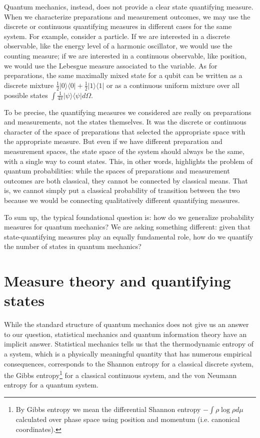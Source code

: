 \documentclass[entropy,article,submit,pdftex,moreauthors]{Definitions/mdpi}
\def\>{\rangle}
\def\<{\langle}
\begin{document}

Quantum mechanics, instead, does not provide a clear state quantifying measure. When we characterize preparations and measurement outcomes, we may use the discrete or continuous quantifying measures in different cases for the same system. For example, consider a particle. If we are interested in a discrete observable, like the energy level of a harmonic oscillator, we would use the counting measure; if we are interested in a continuous observable, like position, we would use the Lebesgue measure associated to the variable. As for preparations, the same maximally mixed state for a qubit can be written as a discrete mixture $\frac{1}{2} | 0 \> \< 0 | + \frac{1}{2} | 1 \> \< 1 | $ or as a continuous uniform mixture over all possible states $\int \frac{1}{4\pi} | \psi \> \< \psi | d\Omega$.

To be precise, the quantifying measures we considered are really on preparations and measurements, not the states themselves. It was the discrete or continuous character of the space of preparations that selected the appropriate space with the appropriate measure. But even if we have different preparation and measurement spaces, the state space of the system should always be the same, with a single way to count states. This, in other words, highlights the problem of quantum probabilities: while the spaces of preparations and measurement outcomes are both classical, they cannot be connected by classical means. That is, we cannot simply put a classical probability of transition between the two because we would be connecting qualitatively different quantifying measures.

To sum up, the typical foundational question is: how do we generalize probability measures for quantum mechanics? We are asking something different: given that state-quantifying measures play an equally fundamental role, how do we quantify the number of states in quantum mechanics?

\section{Measure theory and quantifying states}

While the standard structure of quantum mechanics does not give us an answer to our question, statistical mechanics and quantum information theory have an implicit answer. Statistical mechanics tells us that the thermodynamic entropy of a system, which is a physically meaningful quantity that has numerous empirical consequences, corresponds to the Shannon entropy for a classical discrete system, the Gibbs entropy\footnote{By Gibbs entropy we mean the differential Shannon entropy $-\int \rho \log \rho d\mu$ calculated over phase space using position and momentum (i.e. canonical coordinates).} for a classical continuous system, and the von Neumann entropy for a quantum system.
\end{document}
